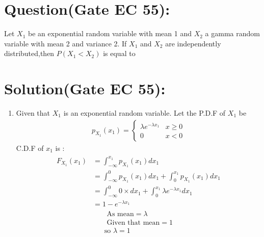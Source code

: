 \documentclass[journal,12pt,twocolumn]{IEEEtran}
\begin{document}
\section*{Question(Gate EC 55):}
 Let $X_1$ be an exponential random variable
with mean 1 and $X_2$ a gamma random variable
with mean 2 and variance 2. If $X_1$ and $X_2$ are
independently distributed,then $P(X_1 < X_2)$ is equal to
\section*{Solution(Gate EC 55):}
\begin{enumerate}
    \item Given that $X_1$ is an exponential random variable. Let the P.D.F of $X_1$ be
    \begin{align}
    p_{X_1}(x_1)=
        \begin{cases}
        \lambda e^{-\lambda x_1} & x \geq 0\\
        0 & x<0
        \end{cases}
    \end{align}
    C.D.F of $x_1$ is :
    \begin{align}
    \begin{split}
        F_{X_1}(x_1)&=\int_{-\infty}^{x_1} p_{X_1}(x_1) dx_1\\
        &=\int_{-\infty}^0 p_{X_1}(x_1) dx_1+\int_{0}^{x_1} p_{X_1}(x_1) dx_1\\
        &=\int_{-\infty}^0 0 \times dx_1+\int_{0}^ {x_1} \lambda e^{-\lambda x_1} dx_1\\
        &=1-e^{-\lambda x_1}\label{eq:0.0.2}
        \end{split}
    \end{align}
    \begin{align}
    \text{ As mean}=\lambda\\
     \text{ Given that mean}=1\\
     \text{so } \lambda=1 \label{eq:0.0.5}
    \end{align} 
     

\end{enumerate}
\end{document}
